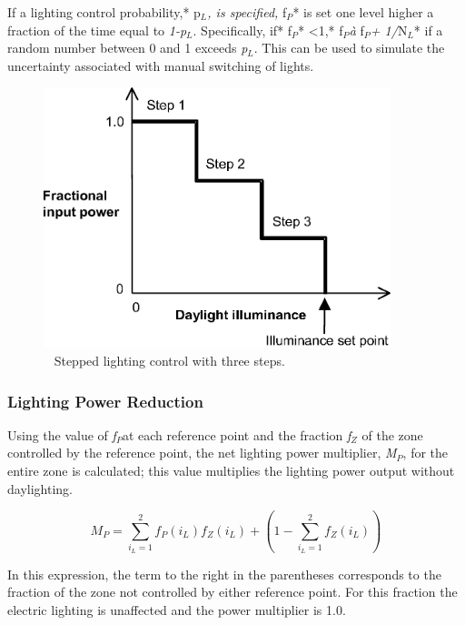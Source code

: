 If a lighting control probability,* p\(_{L}\)\emph{, is specified,} f\(_{P}\)* is set one level higher a fraction of the time equal to \emph{1-p\(_{L}\)}. Specifically, if* f\(_{P}\)* \textless{}1,* f\(_{P}\)\emph{à} f\(_{P}\)\emph{+ 1/}N\(_{L}\)* if a random number between 0 and 1 exceeds \emph{p\(_{L}\)}. This can be used to simulate the uncertainty associated with manual switching of lights.

\begin{figure}[hbtp] %
\centering
\includegraphics[width=0.9\textwidth, height=0.9\textheight, keepaspectratio=true]{media/image825.png}
\caption{  Stepped lighting control with three steps. \protect \label{fig:stepped-lighting-control-with-three-steps.}}
\end{figure}

\subsubsection{Lighting Power Reduction}\label{lighting-power-reduction}

Using the value of \emph{f\(_{P}\)}at each reference point and the fraction \emph{f\(_{Z}\)} of the zone controlled by the reference point, the net lighting power multiplier, \emph{M\(_{P}\)}, for the entire zone is calculated; this value multiplies the lighting power output without daylighting.

\begin{equation}
{M_P} = \sum\limits_{{i_L} = 1}^2 {{f_P}({i_L})} {f_Z}({i_L}) + \left( {1 - \sum\limits_{{i_L} = 1}^2 {} {f_Z}({i_L})} \right)
\end{equation}

In this expression, the term to the right in the parentheses corresponds to the fraction of the zone not controlled by either reference point. For this fraction the electric lighting is unaffected and the power multiplier is 1.0.

